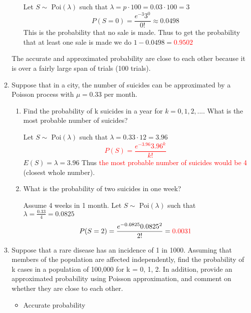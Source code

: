 \documentclass{article}
\begin{document}
\begin{enumerate}
\begin{itemize}
            Let $S \sim$ Poi$(\lambda)$ such that $\lambda=p\cdot100=0.03\cdot100=3$
            \begin{equation*}
                P(S=0)=\frac{e^{-3}3^0}{0!}\approx 0.0498
            \end{equation*}
            This is the probability that no sale is made.
            Thus to get the probability that at least one sale is made we do $1-0.0498=$\textcolor{red}{$0.9502$}
        \end{itemize}
        The accurate and approximated probability are close to each other because it is over a fairly large span of trials (100 trials). 
        \item Suppose that in a city, the number of suicides can be approximated by a Poisson process with $\mu = 0.33$ per month.
        \begin{enumerate}
            \item Find the probability of k suicides in a year for $k = 0, 1, 2, ....$ What is the most probable number of suicides?

            
            Let $S \sim$ Poi$(\lambda)$ such that $\lambda=0.33\cdot12=3.96$
            \textcolor{red}{
                \begin{equation*}
                    P(S)=\frac{e^{-3.96}3.96^k}{k!}
                \end{equation*}
            }
            $E(S)=\lambda=3.96$ Thus \textcolor{red}{the most probable number of suicides would be 4} (closest whole number).
            \item What is the probability of two suicides in one week?

            Assume 4 weeks in 1 month.
            Let $S \sim$ Poi$(\lambda)$ such that $\lambda=\frac{0.33}{4}=0.0825$
            \begin{equation*}
                P(S=2)=\frac{e^{-0.0825}0.0825^2}{2!}=\textcolor{red}{0.0031}
            \end{equation*}
        \end{enumerate}
\pagebreak
        \item Suppose that a rare disease has an incidence of 1 in 1000. Assuming that members of the population are affected independently, find the probability of k cases in a population of 100,000 for k = 0, 1, 2. In addition, provide an approximated probability using Poisson approximation, and comment on whether they are close to each other.
        \begin{itemize}
            \item Accurate probability


\end{itemize}
\end{enumerate}
\end{document}
